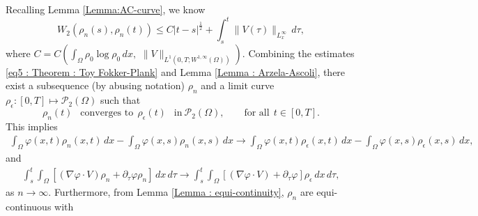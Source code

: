 \documentclass{amsart}
\numberwithin{equation}{section}
\begin{document}
 Recalling Lemma \ref{Lemma:AC-curve}, we know%
\begin{equation}\label{eq5 : Theorem : Toy Fokker-Plank}
W_{2}(\rho_n(s),\rho_n(t))\leq C |t-s|^{\frac{1}{2}} + \int_s^t
\|V(\tau)\|_{L^\infty_x}  \,d\tau,
\end{equation}
where $C=C\left(  \int_\Omega \rho_0 \log \rho_0 \, dx,  \,  \,\|V\|_{L^1(0,T;
W^{1,\infty}(\Omega))} \right) $. Combining the estimates \eqref{eq5
: Theorem : Toy Fokker-Plank} and Lemma \ref{Lemma : Arzela-Ascoli},
there exist a subsequence (by abusing notation) $\rho_n$ and a limit
curve  $\rho_\epsilon :[0,T]\mapsto \mathcal{P}_{2}(\Omega)$ such that
\begin{equation*}\label{eq11 : Theorem : Toy Fokker-Plank}
\rho_{n}(t) ~~ \mbox{ converges to} ~~\rho_\epsilon (t) ~~ \mbox{ in} ~
\mathcal{P}_{2}({\Omega}), \qquad \text{for all} ~~ t\in[0,T].
\end{equation*}
 This implies
\begin{equation}\label{eq 1 : proposition : regular existence}
\begin{aligned}
\int_{\Omega}\varphi(x,t) \rho_n(x,t)\,dx -
\int_{\Omega}\varphi(x,s) \rho_n(x,s)\,dx \longrightarrow
\int_{\Omega}\varphi(x,t) \rho_\epsilon(x,t)\,dx - \int_{\Omega}\varphi(x,s)
\rho_\epsilon (x,s)\,dx,
\end{aligned}
\end{equation}
and
\begin{equation}\label{eq 2 : proposition : regular existence}
\begin{aligned}
\int_{s}^{t} \int_{\Omega}  \left[ (\nabla   \varphi \cdot V) \rho_n
+ \partial_\tau\varphi  \rho_n \right] \,dx  \,d\tau
\longrightarrow \int_{s}^{t} \int_{\Omega}  \left[ (\nabla
\varphi\cdot V) + \partial_\tau\varphi  \right]\rho_\epsilon \,dx  \,d\tau,
\end{aligned}
\end{equation}
as $n \rightarrow \infty$. Furthermore,  from Lemma \ref{Lemma :
equi-continuity}, $\rho_n$ are equi-continuous with
\end{document}
